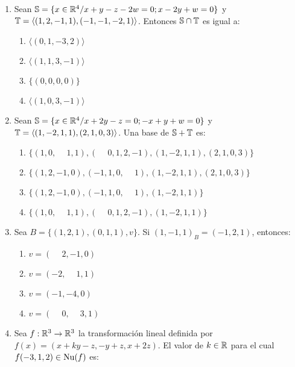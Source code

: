 \documentclass[../practica.root.tex]{subfiles}
\begin{document}
\begin{enumerate}
          \hrulefill{}
    \item Sean $\mathbb{S}=\{x\in\mathbb{R}^4/x+y-z-2w=0;x-2y+w=0\}$ y\\
          $\mathbb{T}=\langle(1,2,-1,1),(-1,-1,-2,1)\rangle$. Entonces $\mathbb{S}\cap\mathbb{T}$ es
          igual a:

          \begin{enumerate}
              \item $\langle(0,1,-3,2)\rangle$
              \item $\langle(1,1,3,-1)\rangle$
              \item $\{(0,0,0,0)\}$
              \item $\langle(1,0,3,-1)\rangle$
          \end{enumerate}

          \hrulefill{}
    \item Sean $\mathbb{S}=\{x\in\mathbb{R}^4/x+2y-z=0;-x+y+w=0\}$ y\\
          $\mathbb{T}=\langle(1,-2,1,1),(2,1,0,3)\rangle$. Una base de $\mathbb{S}+\mathbb{T}$ es:

          \begin{enumerate}
              \item $\{(1,0,\phantom{-}1,1),(\phantom{-}0,1,2,-1),(1,-2,1,1),(2,1,0,3)\}$
              \item $\{(1,2,-1,0),(-1,1,0,\phantom{-}1),(1,-2,1,1),(2,1,0,3)\}$
              \item $\{(1,2,-1,0),(-1,1,0,\phantom{-}1),(1,-2,1,1)\}$
              \item $\{(1,0,\phantom{-}1,1),(\phantom{-}0,1,2,-1),(1,-2,1,1)\}$
          \end{enumerate}

          \hrulefill{}
    \item Sea $B=\{(1,2,1),(0,1,1),v\}$. Si ${(1,-1,1)}_B=(-1,2,1)$, entonces:

          \begin{enumerate}
              \item $v=(\phantom{-}2,-1,0)$
              \item $v=(-2,\phantom{-}1,1)$
              \item $v=(-1,-4,0)$
              \item $v=(\phantom{-}0,\phantom{-}3,1)$
          \end{enumerate}

          \hrulefill{}
    \item Sea $f:\mathbb{R}^3\to\mathbb{R}^3$ la transformación lineal definida por
          $f(x)=(x+ky-z,-y+z,x+2z)$. El valor de $k\in\mathbb{R}$ para el cual
          $f(-3,1,2)\in\operatorname{Nu}(f)$ es:


\end{enumerate}
\end{document}
